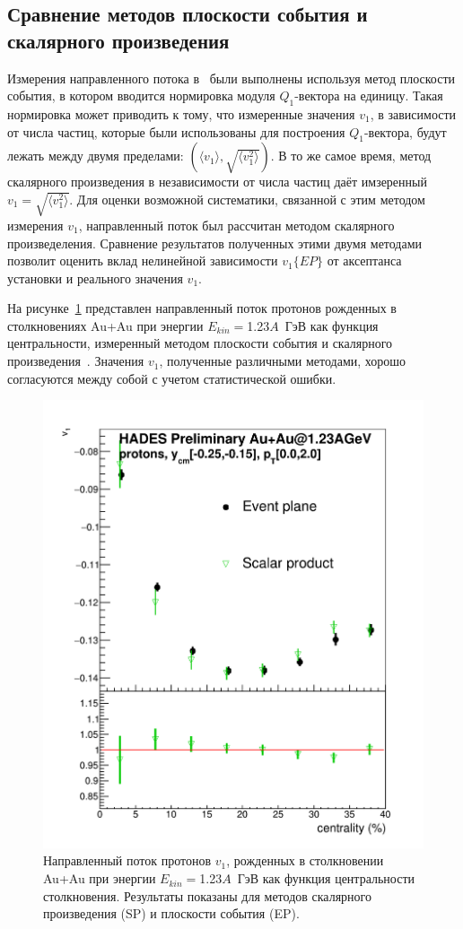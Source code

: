 \subsection{Сравнение методов плоскости события и скалярного произведения}

Измерения направленного потока в~\cite{HADES:2020lob} были выполнены используя метод плоскости события, в котором вводится нормировка модуля $Q_1$-вектора на единицу. 
Такая нормировка может приводить к тому, что измеренные значения $v_1$, в зависимости от числа частиц, которые были использованы для построения $Q_1$-вектора, будут лежать между двумя пределами: $(\langle v_1 \rangle , \sqrt{ \langle v_1^2 \rangle })$.
В то же самое время, метод скалярного произведения в независимости от числа частиц даёт имзеренный $v_1 = \sqrt{ \langle v_1^2 \rangle }$.
Для оценки возможной систематики, связанной с этим методом измерения $v_1$, направленный поток был рассчитан методом скалярного произведеления.
Сравнение результатов полученных этими двумя методами позволит оценить вклад нелинейной зависимости $v_1\{EP\}$ от аксептанса установки и реального значения $v_1$.

На рисунке~\ref{fig:hades_ep_vs_sp} представлен направленный поток протонов рожденных в столкновениях Au+Au при энергии $E_{kin}=$1.23$A$~ГэВ как функция центральности, измеренный методом плоскости события и скалярного произведения~\cite{Mamaev:2020lpi}. 
Значения $v_1$, полученные различными методами, хорошо согласуются между собой с учетом статистической ошибки. 
%
\begin{figure}[ht]
\begin{center}
\includegraphics[width=0.45\linewidth]{images/EP_vs_SP.png}
\caption{Направленный поток протонов $v_1$, рожденных в столкновении Au+Au при энергии $E_{kin}=$1.23$A$~ГэВ как функция центральности столкновения. Результаты показаны для методов скалярного произведения (SP) и плоскости события (EP).}
\label{fig:hades_ep_vs_sp}
\end{center}
\end{figure}

